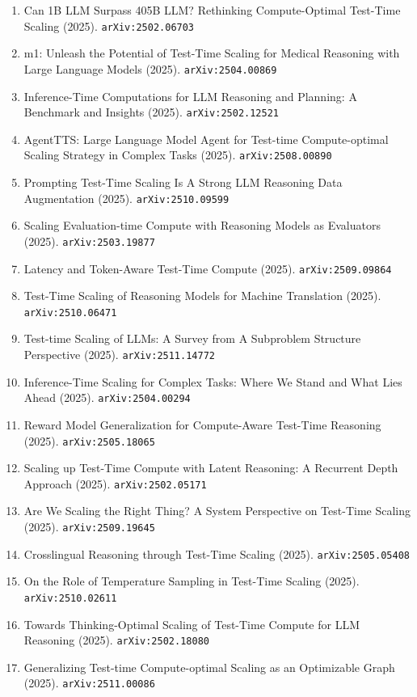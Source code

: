 \documentclass[11pt]{article}
\begin{document}
\begin{enumerate}
  Where, and How Well? (2025). \texttt{arXiv:2503.24235}
  \item Can 1B LLM Surpass 405B LLM? Rethinking Compute-Optimal Test-Time
  Scaling (2025). \texttt{arXiv:2502.06703}
  \item m1: Unleash the Potential of Test-Time Scaling for Medical Reasoning with Large Language Models (2025). \texttt{arXiv:2504.00869}
  \item Inference-Time Computations for LLM Reasoning and Planning: A Benchmark
  and Insights (2025). \texttt{arXiv:2502.12521}
  \item AgentTTS: Large Language Model Agent for Test-time Compute-optimal Scaling Strategy in Complex Tasks (2025). \texttt{arXiv:2508.00890}
  \item Prompting Test-Time Scaling Is A Strong LLM Reasoning Data Augmentation (2025). \texttt{arXiv:2510.09599}
  \item Scaling Evaluation-time Compute with Reasoning Models as Evaluators (2025). \texttt{arXiv:2503.19877}
  \item Latency and Token-Aware Test-Time Compute (2025). \texttt{arXiv:2509.09864}
  \item Test-Time Scaling of Reasoning Models for Machine Translation (2025). \texttt{arXiv:2510.06471}
  \item Test-time Scaling of LLMs: A Survey from A Subproblem Structure Perspective (2025). \texttt{arXiv:2511.14772}
  \item Inference-Time Scaling for Complex Tasks: Where We Stand and What Lies
  Ahead (2025). \texttt{arXiv:2504.00294}
  \item Reward Model Generalization for Compute-Aware Test-Time Reasoning (2025). \texttt{arXiv:2505.18065}
  \item Scaling up Test-Time Compute with Latent Reasoning: A Recurrent Depth
  Approach (2025). \texttt{arXiv:2502.05171}
  \item Are We Scaling the Right Thing? A System Perspective on Test-Time Scaling (2025). \texttt{arXiv:2509.19645}
  \item Crosslingual Reasoning through Test-Time Scaling (2025). \texttt{arXiv:2505.05408}
  \item On the Role of Temperature Sampling in Test-Time Scaling (2025). \texttt{arXiv:2510.02611}
  \item Towards Thinking-Optimal Scaling of Test-Time Compute for LLM Reasoning (2025). \texttt{arXiv:2502.18080}
  \item Generalizing Test-time Compute-optimal Scaling as an Optimizable Graph (2025). \texttt{arXiv:2511.00086}

\end{enumerate}
\end{document}
